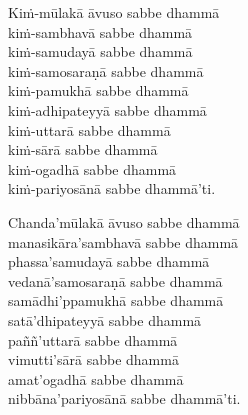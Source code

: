 \begin{leader}
\end{leader}

\enlargethispage{2\baselineskip}

Kiṁ-mūlakā āvuso sabbe dhammā\\
kiṁ-sambhavā sabbe dhammā\\
kiṁ-samudayā sabbe dhammā\\
kiṁ-samosaraṇā sabbe dhammā\\
kiṁ-pamukhā sabbe dhammā\\
kiṁ-adhipateyyā sabbe dhammā\\
kiṁ-uttarā sabbe dhammā\\
kiṁ-sārā sabbe dhammā\\
kiṁ-ogadhā sabbe dhammā\\
kiṁ-pariyosānā sabbe dhammā'ti.

Chanda'mūlakā āvuso sabbe dhammā\\
manasikāra'sambhavā sabbe dhammā\\
phassa'samudayā sabbe dhammā\\
vedanā'samosaraṇā sabbe dhammā\\
samādhi'ppamukhā sabbe dhammā\\
satā'dhipateyyā sabbe dhammā\\
paññ'uttarā sabbe dhammā\\
vimutti'sārā sabbe dhammā\\
amat'ogadhā sabbe dhammā\\
nibbāna'pariyosānā sabbe dhammā'ti.

\clearpage

